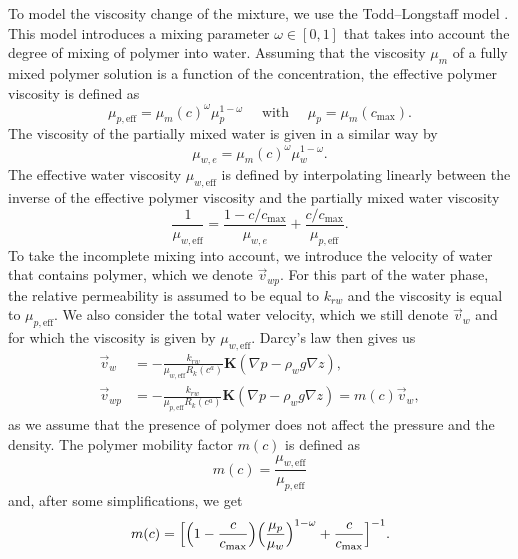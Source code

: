 \documentclass[11pt]{amsart}
\newcommand{\cads}{c^a}
\newcommand{\eff}{\mathrm{eff}}
\newcommand{\cmax}{c_{\max}}
\newcommand{\Kb}{{\bm{K}}}
\begin{document}
To model the viscosity change of the mixture, we use the Todd--Longstaff model \cite{TL72:jpt}.
This model introduces a mixing parameter $\omega\in[0, 1]$ that takes into account the degree of
mixing of polymer into water. Assuming that the viscosity $\mu_m$ of a fully mixed polymer solution
is a function of the concentration, the effective polymer viscosity is defined as
\begin{equation}
  \label{eq:defmupeff}
  \mu_{p,\eff}=\mu_m(c)^\omega\mu_p^{1-\omega}\quad\text{ with }\quad  \mu_p=\mu_m(c_{\max}).
\end{equation}
The viscosity of the partially mixed water is given in a similar way by
\begin{equation}
  \label{eq:defmuwe}
  \mu_{w,e}=\mu_m(c)^\omega\mu_w^{1-\omega}.
\end{equation}
The effective water viscosity $\mu_{w,\eff}$ is defined by interpolating linearly between
the inverse of the effective polymer viscosity and the partially mixed water viscosity
\begin{equation}
  \label{eq:defmuweff}
  \frac{1}{\mu_{w,\eff}}=\frac{1-c/\cmax}{\mu_{w,e}}+\frac{c/\cmax}{\mu_{p,\eff}}.
\end{equation}
To take the incomplete mixing into account, we introduce the velocity of water that contains
polymer, which we denote $\vec{v}_{wp}$. For this part of the water phase, the relative permeability
is assumed to be equal to $k_{rw}$ and the viscosity is equal to $\mu_{p,\eff}$.  We also consider
the total water velocity, which we still denote $\vec{v}_{w}$ and for which the viscosity is given
by $\mu_{w,\eff}$. Darcy's law then gives us
\begin{align}
  \label{eq:uwdarc}
  \vec{v}_{w} &=-\frac{k_{rw}}{\mu_{w,\eff}R_k(\cads)}\Kb(\nabla p-\rho_w g\nabla z),\\
  \label{eq:uwpdarc}
  \vec{v}_{wp} &=-\frac{k_{rw}}{\mu_{p,\eff}R_k(\cads)}\Kb(\nabla p-\rho_w g\nabla z) =
  m(c)\vec{v}_w,
\end{align}
as we assume that the presence of polymer does not affect the pressure and the density. The polymer
mobility factor $m(c)$ is defined as
\begin{equation*}
  m(c) = \frac{\mu_{w,\eff}}{\mu_{p,\eff}} 
\end{equation*}
and, after some simplifications, we get
\begin{equation}
  \label{eq:def_m}
  m(c) = \Bigl[\Bigl(1 -\frac{c}{\cmax}\Bigr)
  \Bigl(\frac{\mu_p}{\mu_w}\Bigr)^{1-\omega} + \frac{c}{\cmax}\Bigr]^{-1}.  
\end{equation}
\end{document}
